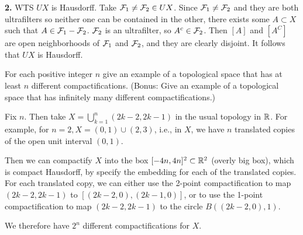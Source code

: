 \documentclass[a4paper, 10pt]{article}
\begin{document}
\begin{solution}
    \textbf{2.} WTS $UX$ is Hausdorff. Take $\mathcal{F}_1 \neq \mathcal{F}_2 \in UX$. Since $\mathcal{F}_1 \neq \mathcal{F}_2$ and they are both ultrafilters so neither one can be contained in the other, there exists some $A \subset X$ such that $A \in \mathcal{F}_1 - \mathcal{F}_2$. $\mathcal{F}_2$ is an ultrafilter, so $A^c \in \mathcal{F}_2$. Then $[A]$ and $[A^C]$ are open neighborhoods of $\mathcal{F}_1$ and $\mathcal{F}_2$, and they are clearly disjoint. It follows that $UX$ is Hausdorff.
\end{solution}
\begin{problem} [Problem 3]
    For each positive integer $n$ give an example of a topological space that has at least $n$ different compactifications. (Bonus: Give an example of a topological space that has infinitely many different compactifications.)
\end{problem}
\begin{solution}
    Fix $n$. Then take $X = \bigcup_{k = 1}^{n} (2k-2, 2k-1)$ in the usual topology in $\mathbb{R}$. For example, for $n = 2, X = (0, 1) \cup (2, 3)$, i.e., in $X$, we have $n$ translated copies of the open unit interval $(0, 1)$.

    Then we can compactify $X$ into the box $[-4n, 4n]^2 \subset \mathbb{R}^2$ (overly big box), which is compact Hausdorff, by specify the embedding for each of the translated copies. For each translated copy, we can either use the 2-point compactification to map $(2k-2, 2k-1)$ to $[(2k-2, 0), (2k-1, 0)]$, or to use the 1-point compactification to map $(2k-2, 2k-1)$ to the circle $B((2k-2, 0), 1)$.

    We therefore have $2^n$ different compactifications for $X$.
\end{solution}
\end{document}
